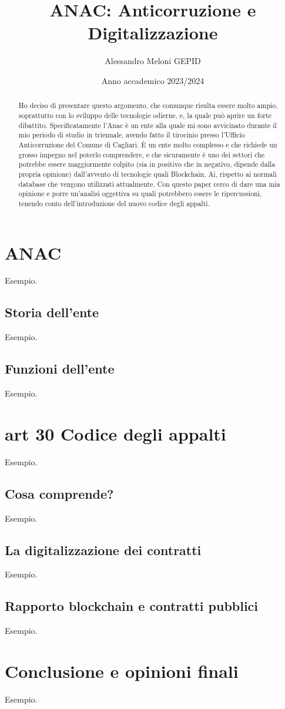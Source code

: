 \documentclass{article}
\title{ANAC: Anticorruzione e Digitalizzazione}
\author{Alessandro Meloni GEPID}
\date{Anno accademico 2023/2024}
\begin{document}
\maketitle
\begin{abstract}
    \begin{justify}
Ho deciso di presentare questo argomento, che comunque risulta essere molto ampio, soprattutto con lo sviluppo delle tecnologie odierne, e, la quale può aprire un forte dibattito. Specificatamente l'Anac è un ente alla quale mi sono avvicinato durante il mio periodo di studio in triennale, avendo fatto il tirocinio presso l'Ufficio Anticorruzione del Comune di Cagliari. È un ente molto complesso e che richiede un grosso impegno nel poterlo comprendere, e che sicuramente è uno dei settori che potrebbe essere maggiormente colpito (sia in positivo che in negativo, dipende dalla propria opinione) dall'avvento di tecnologie quali Blockchain, Ai, rispetto ai normali database che vengono utilizzati attualmente. Con questo paper cerco di dare una mia opinione e porre un'analisi oggettiva su quali potrebbero essere le ripercussioni, tenendo conto dell'introduzione del nuovo codice degli appalti.
\end{justify}
\end{abstract}

\centering \tableofcontents
\newpage\centering
\section{ANAC}
\flushleft Esempio.

\flushleft \subsection{Storia dell'ente}
Esempio.
\flushleft \subsection{Funzioni dell'ente}
Esempio.
\newpage\centering
\section{art 30 Codice degli appalti}
\flushleft Esempio.

\flushleft \subsection{Cosa comprende?}
Esempio.
\flushleft \subsection{La digitalizzazione dei contratti}
Esempio.
\flushleft \subsection{Rapporto blockchain e contratti pubblici}
Esempio.

\newpage \centering
\section{Conclusione e opinioni finali}
\flushleft Esempio.
\end{document}
